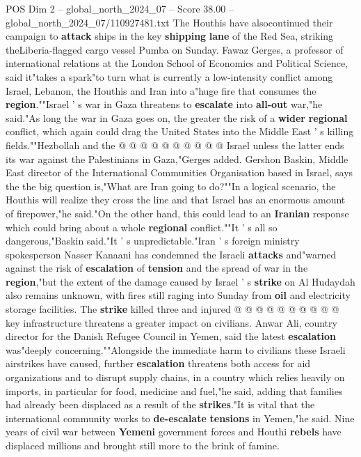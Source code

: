 \begin{textsample}{POS Dim 2 – global\_north\_2024\_07 – Score 38.00 – global\_north\_2024\_07/110927481.txt}
The Houthis have alsocontinued their campaign to \textbf{attack} ships in the key \textbf{shipping} \textbf{lane} of the Red Sea, striking theLiberia-flagged cargo vessel Pumba on Sunday.
Fawaz Gerges, a professor of international relations at the London School of Economics and Political Science, said it"takes a spark"to turn what is currently a low-intensity conflict among Israel, Lebanon, the Houthis and Iran into a"huge fire that consumes the \textbf{region}.""Israel ' s war in Gaza threatens to \textbf{escalate} into \textbf{all-out} war,"he said."As long the war in Gaza goes on, the greater the risk of a \textbf{wider} \textbf{regional} conflict, which again could drag the United States into the Middle East ' s killing fields.""Hezbollah and the @ @ @ @ @ @ @ @ @ @ Israel unless the latter ends its war against the Palestinians in Gaza,"Gerges added.
Gershon Baskin, Middle East director of the International Communities Organisation based in Israel, says the the big question is,"What are Iran going to do?""In a logical scenario, the Houthis will realize they cross the line and that Israel has an enormous amount of firepower,"he said."On the other hand, this could lead to an \textbf{Iranian} response which could bring about a whole \textbf{regional} conflict.""It ' s all so dangerous,"Baskin said."It ' s unpredictable."Iran ' s foreign ministry spokesperson Nasser Kanaani has condemned the Israeli \textbf{attacks} and"warned against the risk of \textbf{escalation} of \textbf{tension} and the spread of war in the \textbf{region},"but the extent of the damage caused by Israel ' s \textbf{strike} on Al Hudaydah also remains unknown, with fires still raging into Sunday from \textbf{oil} and electricity storage facilities.
The \textbf{strike} killed three and injured @ @ @ @ @ @ @ @ @ @ key infrastructure threatens a greater impact on civilians.
Anwar Ali, country director for the Danish Refugee Council in Yemen, said the latest \textbf{escalation} was"deeply concerning.""Alongside the immediate harm to civilians these Israeli airstrikes have caused, further \textbf{escalation} threatens both access for aid organizations and to disrupt supply chains, in a country which relies heavily on imports, in particular for food, medicine and fuel,"he said, adding that families had already been displaced as a result of the \textbf{strikes}."It is vital that the international community works to \textbf{de-escalate} \textbf{tensions} in Yemen,"he said.
Nine years of civil war between \textbf{Yemeni} government forces and Houthi \textbf{rebels} have displaced millions and brought still more to the brink of famine.

\end{textsample}
